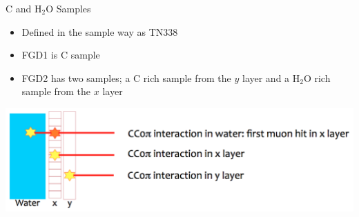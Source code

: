 \documentclass{beamer}
\begin{document}
\begin{frame}{C and H$_2$O Samples}
    \begin{itemize}
        \item Defined in the sample way as TN338
        \item FGD1 is C sample
        \item FGD2 has two samples; a C rich sample from the $y$ layer and a H$_2$O rich sample from the $x$ layer 
            \end{itemize}
            \includegraphics[width=\textwidth]{images/FGD2Layers.png}
\end{frame}
\end{document}
